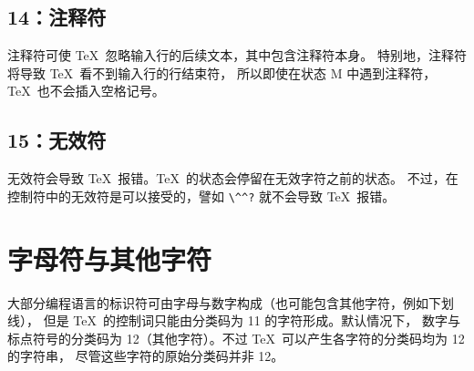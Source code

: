 \documentclass{book}
\begin{document}
\subsection{14：注释符}

注释符可使 \TeX\ 忽略输入行的后续文本，其中包含注释符本身。
特别地，注释符将导致 \TeX\ 看不到输入行的行结束符，
所以即使在状态 {\italic M} 中遇到注释符，\TeX\ 也不会插入空格记号。

\subsection{15：无效符}

无效符会导致 \TeX\ 报错。\TeX\ 的状态会停留在无效字符之前的状态。
不过，在控制符中的无效符是可以接受的，譬如 \verb>\^^?> 就不会导致 \TeX\ 报错。

\section{字母符与其他字符}
\label{cat12}

大部分编程语言的标识符可由字母与数字构成（也可能包含其他字符，例如下划线），
但是 \TeX\ 的控制词只能由分类码为 11 的字符形成。默认情况下，
数字与标点符号的分类码为 12（其他字符）。不过 \TeX\
可以产生各字符的分类码均为 12 的字符串，
尽管这些字符的原始分类码并非 12。
\end{document}
